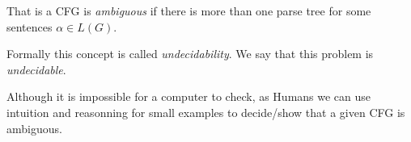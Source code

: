 That is a CFG is \textit{ambiguous} if there is more than one 
parse tree for some sentences $\alpha \in L(G)$.


Formally this concept is called \textit{undecidability}. 
We say that this problem is \textit{undecidable}. 

Although it is impossible for a computer to check, 
as Humans we can use intuition and reasonning for small 
examples to decide/show that a given CFG is ambiguous.














\frmrule 

